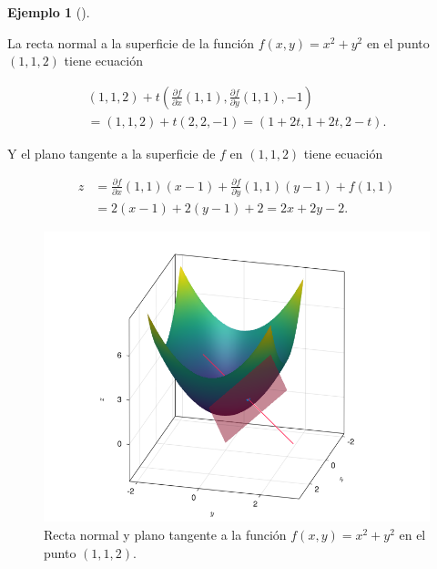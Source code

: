 \documentclass[
  a4paper,
]{scrreport}
\theoremstyle{definition}
\theoremstyle{plain}
\theoremstyle{plain}
\theoremstyle{definition}
\theoremstyle{definition}
\newtheorem{example}{Ejemplo}[chapter]
\theoremstyle{plain}
\theoremstyle{remark}
\begin{document}
\begin{example}[]\protect\hypertarget{exm-recta-normal-plano-tangente}{}\label{exm-recta-normal-plano-tangente}

La recta normal a la superficie de la función \(f(x,y)=x^2+y^2\) en el
punto \((1,1,2)\) tiene ecuación

\[
\begin{gathered}
(1,1,2)+ t \left(\frac{\partial f}{\partial x}(1,1), \frac{\partial f}{\partial y}(1,1), -1\right) \\
= (1,1,2)+ t (2,2,-1) = (1+2t,1+2t,2-t).
\end{gathered}
\]

Y el plano tangente a la superficie de \(f\) en \((1,1,2)\) tiene
ecuación

\begin{align*}
z 
&= \frac{\partial f}{\partial x}(1,1)(x-1) + \frac{\partial f}{\partial y}(1,1)(y-1)+f(1,1) \\
&= 2(x-1) + 2(y-1) + 2 =  2x+2y-2.
\end{align*}

\begin{figure}

{\centering \includegraphics{./img/derivadas-funciones-varias-variables/recta-normal-plano-tangente.png}

}

\caption{Recta normal y plano tangente a la función \(f(x,y)=x^2+y^2\)
en el punto \((1,1,2)\).}

\end{figure}

\end{example}
\end{document}
